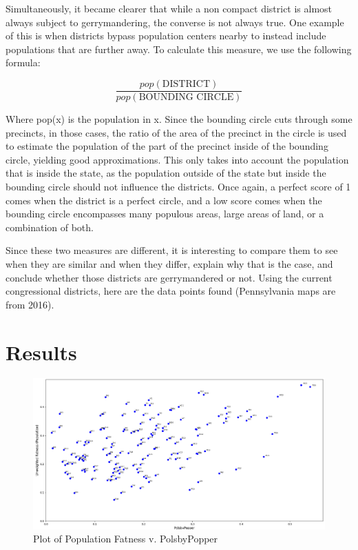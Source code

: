 \documentclass[letterpaper]{article}
\begin{document}
Simultaneously, it became clearer that while a non compact district is almost always subject to gerrymandering, the converse is not always true. One example of this is when districts bypass population centers nearby to instead include populations that are further away. 
To calculate this measure, we use the following formula:

\[
	\frac{pop(\text{DISTRICT})}{pop(\text{BOUNDING CIRCLE})}
\]

Where pop(x) is the population in x. Since the bounding circle cuts through some precincts, in those cases, the ratio of the area of the precinct in the circle is used to estimate the population of the part of the precinct inside of the bounding circle, yielding good approximations. This only takes into account the population that is inside the state, as the population outside of the state but inside the bounding circle should not influence the districts. Once again, a perfect score of 1 comes when the district is a perfect circle, and a low score comes when the bounding circle encompasses many populous areas, large areas of land, or a combination of both.


Since these two measures are different, it is interesting to compare them to see when they are similar and when they differ, explain why that is the case, and conclude whether those districts are gerrymandered or not. Using the current congressional districts, here are the data points found (Pennsylvania maps are from 2016).


\section{Results}

\begin{figure}[H]
	\includegraphics[width=\linewidth]{./figures/fatnessPopulationVpolsbyPopper.png}
	\caption{Plot of Population Fatness v. PolsbyPopper}
	\label{fig:datapoints}
\end{figure}
\end{document}
